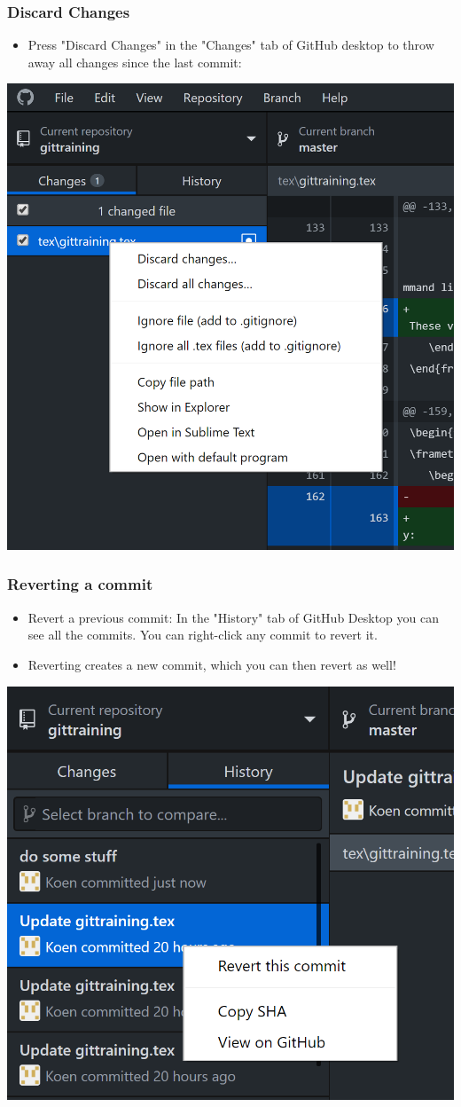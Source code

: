 \documentclass{beamer}
\begin{document}
\begin{frame}
	\frametitle{Discard Changes}
	\begin{itemize}
		\item Press "Discard Changes" in the "Changes" tab of GitHub desktop to throw away all changes since the last commit:
	\end{itemize}
	\hfill\includegraphics[width=0.6\linewidth]{figures/DiscardChanges.png}\hfill\strut


\end{frame}

\begin{frame}
	\frametitle{Reverting a commit}
	\begin{itemize}
		\item Revert a previous commit: In the "History" tab of GitHub Desktop you can see all the commits. You can right-click any commit to revert it. 
		\item Reverting creates a new commit, which you can then revert as well!
	\end{itemize}
	\hfill\includegraphics[width=0.5\linewidth]{figures/revertcommit.png}\hfill\strut


\end{frame}
\end{document}
